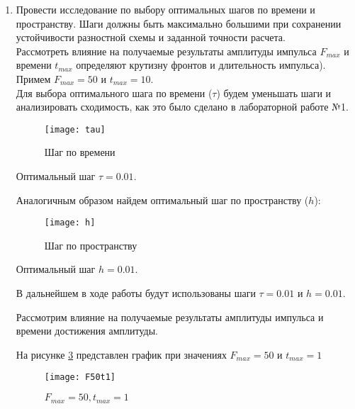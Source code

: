\documentclass[a4paper, 14pt]{article}
\begin{document}
\begin{enumerate}
\item Провести исследование по выбору оптимальных шагов по времени и пространству. Шаги должны быть максимально большими при сохранении устойчивости разностной схемы и заданной точности расчета. \\
Рассмотреть влияние на получаемые результаты амплитуды импульса $F_{max}$ и  времени  $t_{max}$  определяют крутизну фронтов и длительность импульса). \\

Примем $F_{max} = 50$ и  $t_{max} = 10$.\\
Для выбора оптимального шага по времени ($\tau$) будем уменьшать шаги и анализировать сходимость, как это было сделано в лабораторной работе №1.

\begin{figure}[H]
        	\begin{center}
        		\texttt{[image: tau]}
        		\caption{Шаг по времени}
        		\label{tau}
        	\end{center}
\end{figure}

Оптимальный шаг $\tau = 0.01$.

Аналогичным образом найдем оптимальный шаг по пространству ($h$):

\begin{figure}[H]
        	\begin{center}
        		\texttt{[image: h]}
        		\caption{Шаг по пространству}
        		\label{h}
        	\end{center}
\end{figure}

Оптимальный шаг $h = 0.01$.

В дальнейшем в ходе работы будут использованы шаги  $\tau = 0.01$ и $h = 0.01$.

\newpage
Рассмотрим влияние на получаемые результаты амплитуды импульса и времени достижения амплитуды.

На рисунке \ref{F50t1} представлен график при значениях $F_{max} = 50$ и  $t_{max} = 1$

\begin{figure}[H]
        	\begin{center}
        		\texttt{[image: F50t1]}
        		\caption{$F_{max} = 50, t_{max} = 1$}
        		\label{F50t1}
        	\end{center}
\end{figure}


\end{enumerate}
\end{document}
